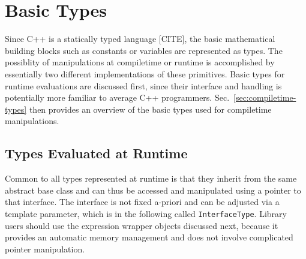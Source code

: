 
\chapter{Basic Types}

Since C++ is a statically typed language [CITE], the basic mathematical building blocks such as constants or variables are represented as types.
The possiblity of manipulations at compiletime or runtime is accomplished by essentially
two different implementations of these primitives.
Basic types for runtime evaluations are discussed first, since their interface and handling is potentially more familiar to average C++ programmers.
Sec.~\ref{sec:compiletime-types} then provides an overview of the basic types used for compiletime manipulations.



\section{Types Evaluated at Runtime} \label{sec:runtime-types}
Common to all types represented at runtime is that they inherit from the same abstract base class 
and can thus be accessed and manipulated using a pointer to that interface.
The interface is not fixed a-priori and can be adjusted via a template parameter, which is in the following called \lstinline|InterfaceType|.
Library users should use the expression wrapper objects discussed next, because it provides an automatic memory management and does not involve complicated pointer manipulation.



